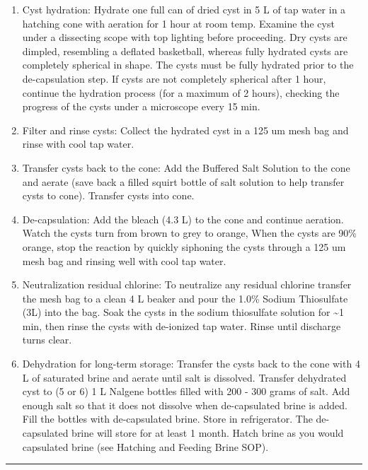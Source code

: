 \documentclass[
]{book}
\providecommand{\tightlist}{%
  \setlength{\itemsep}{0pt}\setlength{\parskip}{0pt}}
\begin{document}
\begin{enumerate}
\def\labelenumi{\arabic{enumi}.}
\tightlist
\item
  Cyst hydration: Hydrate one full can of dried cyst in 5 L of tap water in a hatching cone with aeration for 1 hour at room temp. Examine the cyst under a dissecting scope with top lighting before proceeding. Dry cysts are dimpled, resembling a deflated basketball, whereas fully hydrated cysts are completely spherical in shape. The cysts must be fully hydrated prior to the de-capsulation step. If cysts are not completely spherical after 1 hour, continue the hydration process (for a maximum of 2 hours), checking the progress of the cysts under a microscope every 15 min.
\item
  Filter and rinse cysts: Collect the hydrated cyst in a 125 um mesh bag and rinse with cool tap water.
\item
  Transfer cysts back to the cone: Add the Buffered Salt Solution to the cone and aerate (save back a filled squirt bottle of salt solution to help transfer cysts to cone). Transfer cysts into cone.
\item
  De-capsulation: Add the bleach (4.3 L) to the cone and continue aeration. Watch the cysts turn from brown to grey to orange, When the cysts are 90\% orange, stop the reaction by quickly siphoning the cysts through a 125 um mesh bag and rinsing well with cool tap water.
\item
  Neutralization residual chlorine: To neutralize any residual chlorine transfer the mesh bag to a clean 4 L beaker and pour the 1.0\% Sodium Thiosulfate (3L) into the bag. Soak the cysts in the sodium thiosulfate solution for \textasciitilde1 min, then rinse the cysts with de-ionized tap water. Rinse until discharge turns clear.
\item
  Dehydration for long-term storage: Transfer the cysts back to the cone with 4 L of saturated brine and aerate until salt is dissolved. Transfer dehydrated cyst to (5 or 6) 1 L Nalgene bottles filled with 200 - 300 grams of salt. Add enough salt so that it does not dissolve when de-capsulated brine is added. Fill the bottles with de-capsulated brine. Store in refrigerator. The de-capsulated brine will store for at least 1 month. Hatch brine as you would capsulated brine (see Hatching and Feeding Brine SOP).
\end{enumerate}

\begin{center}\rule{0.5\linewidth}{0.5pt}\end{center}
\end{document}
